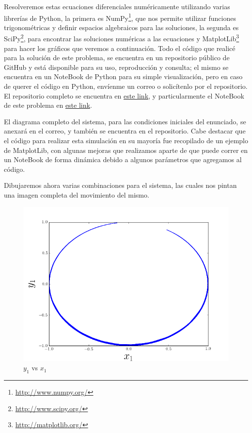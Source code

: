\documentclass[a4paper,10pt]{article}
\numberwithin{equation}{section}
\begin{document}
Resolveremos estas ecuaciones diferenciales numéricamente utilizando varias librerías 
de Python, la primera es NumPy\footnote{\href{http://www.numpy.org/}{http://www.numpy.org/}},
que nos permite utilizar funciones trigonométricas y definir espacios algebraicos para 
las soluciones, la segunda es SciPy\footnote{\href{http://www.scipy.org/}{http://www.scipy.org/}},
para encontrar las soluciones numéricas a las ecuaciones y MatplotLib\footnote{
\href{http://matplotlib.org/}{http://matplotlib.org/}} para hacer los gráficos que 
veremos a continuación. Todo el código que realicé para la solución de este problema,
se encuentra en un repositorio público de GitHub y está disponible para su uso, reproducción
y consulta; el mismo se encuentra en un NoteBook de Python para su simple visualización,
pero en caso de querer el código en Python, envíenme un correo o solicítenlo por el 
repositorio. El repositorio completo se encuentra en \href{https://github.com/FavioVazquez/MecanicaClasica-PCF}{\color{blue} este link},
y particularmente el NoteBook de este problema en \href{https://github.com/FavioVazquez/MecanicaClasica-PCF/blob/master/Tarea4/Problema\%202.ipynb}{\color{blue} este link}.

\vspace{.3cm}

El diagrama completo del sistema, para las condiciones iniciales
del enunciado, se anexará en el correo, y también se encuentra en el 
repositorio. Cabe destacar que el código para realizar esta simulación en su mayoría 
fue recopilado de un ejemplo de MatplotLib, con algunas mejoras que realizamos aparte 
de que puede correr en un NoteBook de forma dinámica debido a algunos parámetros
que agregamos al código.

\vspace{.3cm}

Dibujaremos ahora varias combinaciones para el sistema, las cuales nos pintan 
una imagen completa del movimiento del mismo.

\begin{figure}[H]
\center
\includegraphics[scale=0.5]{problema2fig2}
\caption{$y_1$ vs $x_1$}
\label{fig:problema2fig2}
\end{figure}
\end{document}
